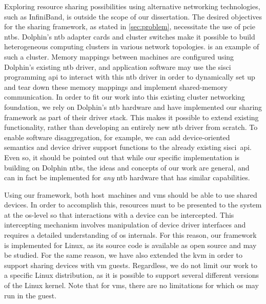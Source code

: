 Exploring resource sharing possibilities using alternative networking technologies, such as InfiniBand, is outside the scope of our dissertation.
%
The desired objectives for the sharing framework, as stated in \cref{sec:problem}, necessitate the use of \gls{pcie} \glspl{ntb}. %
%
Dolphin's \gls{ntb} adapter cards and cluster switches make it possible to build heterogeneous computing clusters in various network topologies.
%
 is an example of such a cluster.
%
Memory mappings between machines are configured using Dolphin's existing \gls{ntb} driver, and application software may use the \gls{sisci} programming \gls{api} to interact with this \gls{ntb} driver in order to dynamically set up and tear down these memory mappings and implement shared-memory communication.
%
In order to fit our work into this existing cluster networking foundation, we rely on Dolphin's \gls{ntb} hardware and have implemented our sharing framework as part of their driver stack.
%
This makes it possible to extend existing functionality, rather than developing an entirely new \gls{ntb} driver from scratch.
%
To enable software \gls{disaggregation}, for example, we can add device-oriented semantics and device driver support functions to the already existing \gls{sisci}~\gls{api}. 
%
Even so, it should be pointed out that while our specific implementation is building on Dolphin \glspl{ntb}, the ideas and concepts of our work are general, and can in fact be implemented for \emph{any} \gls{ntb} hardware that has similar capabilities.



Using our framework, both \gls{host}~machines and \glspl{vm} should be able to use shared devices.
%
In order to accomplish this, resources must to be presented to the system at the \gls{os}-level so that interactions with a device can be intercepted. 
%
This intercepting mechanism involves manipulation of device driver interfaces and requires a detailed understanding of \gls{os} internals.
%
For this reason, our framework is implemented for Linux, as its source code is available as open source and may be studied.
%
For the same reason, we have also extended the \gls{kvm} in order to support sharing devices with \gls{vm} \glspl{guest}.
%
Regardless, we do not limit our work to a specific Linux distribution, as it is possible to support several different versions of the Linux kernel.
%
Note that for \glspl{vm}, there are no limitations for which \gls{os} may run in the \gls{guest}.



